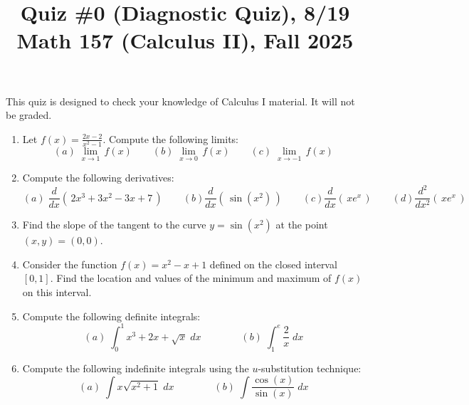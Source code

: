 \documentclass[11pt]{article}
\title{Quiz \#0 (Diagnostic Quiz), 8/19 \\ Math 157 (Calculus II), Fall 2025}
\date{}
\begin{document}
\maketitle

\thispagestyle{empty}

This quiz is designed to check your knowledge of Calculus I material. It will not be graded.

\begin{enumerate}
\item Let $\displaystyle f(x) = \frac{2x-2}{x^2-1}$. Compute the following limits:
\[ (a) \; \lim_{x \to 1} \, f(x) \qquad (b) \; \lim_{x \to 0} \, f(x) \qquad (c) \; \lim_{x \to -1} \, f(x)\]

\item Compute the following derivatives:
\[ (a) \; \frac{d}{dx}(\, 2x^3+3x^2-3x+7\, ) \qquad (b) \frac{d}{dx}(\, \sin(x^2) \,) \qquad (c) \frac{d}{dx} (\, x e^x \,) \qquad (d) \frac{d^2}{dx^2} (\, x e^x \,) \]

\item Find the slope of the tangent to the curve $y= \sin(x^2)$ at the point $(x,y) = (0,0)$.

\item Consider the function $f(x) = x^2-x+1$ defined on the closed interval $[0,1]$. Find the location and values of the minimum and maximum of $f(x)$ on this interval.

\item Compute the following definite integrals:
\[ (a) \; \int_{0}^{1} x^3 + 2x + \sqrt{x} \; dx \qquad \qquad (b) \; \int_{1}^{e} \frac{2}{x} \; dx \]

\item Compute the following indefinite integrals using the $u$-substitution technique:
\[ (a) \; \int x \sqrt{x^2+1} \; dx \qquad \qquad (b) \; \int \frac{\cos(x)}{\sin(x)} \; dx \]


\end{enumerate}
\end{document}
